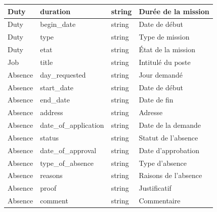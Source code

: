 \begin{longtable}{|p{3.5cm}|p{3.5cm}|p{3cm}|p{5cm}|}
    Duty                     & duration                   & string                      & Durée de la mission  \\ \hline Duty & begin\_date                       &
    string                   & Date de début                                                                   \\ \hline Duty & type & string & Type de mission \\
    \hline Duty              & etat                       & string                      & État de la mission   \\ \hline

    Job                      & title                      & string                      & Intitulé du poste    \\ \hline

    Absence                  & day\_requested             & string                      & Jour demandé         \\ \hline Absence &
    start\_date              & string                     & Date de début                                      \\ \hline Absence & end\_date & string &
    Date de fin                                                                                                \\ \hline Absence & address & string & Adresse \\ \hline Absence        &
    date\_of\_application    & string                     & Date de la demande                                 \\ \hline Absence & status
                             & string                     & Statut de l'absence                                \\ \hline Absence & date\_of\_approval                    & string
                             & Date d'approbation                                                              \\ \hline Absence & type\_of\_absence & string & Type
    d'absence                                                                                                  \\ \hline Absence & reasons & string & Raisons de l'absence \\ \hline
    Absence                  & proof                      & string                      & Justificatif         \\ \hline Absence & comment & string &
    Commentaire                                                                                                \\ \hline

\end{longtable}
\begin{center}  
    \label{tab:table_dictionnaire_data}  
\end{center}  
